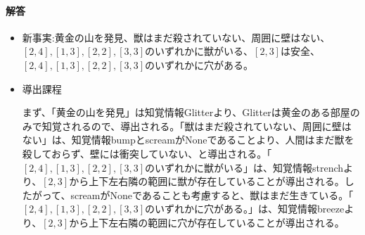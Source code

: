 \documentclass[dvipdfmx]{jsarticle}
\begin{document}
\begin{enumerate}
\paragraph{解答}
\begin{itemize}
  \item 新事実:黄金の山を発見、獣はまだ殺されていない、周囲に壁はない、$[2,4],[1,3],[2,2],[3,3]$のいずれかに獣がいる、$[2,3]$は安全、$[2,4],[1,3],[2,2],[3,3]$のいずれかに穴がある。
  \item 導出課程\par
  まず、「黄金の山を発見」は知覚情報Glitterより、Glitterは黄金のある部屋のみで知覚されるので、導出される。「獣はまだ殺されていない、周囲に壁はない」は、知覚情報bumpとscreamがNoneであることより、人間はまだ獣を殺しておらず、壁には衝突していない、と導出される。「$[2,4],[1,3],[2,2],[3,3]$のいずれかに獣がいる」は、知覚情報strenchより、$[2,3]$から上下左右隣の範囲に獣が存在していることが導出される。したがって、screamがNoneであることも考慮すると、獣はまだ生きている。「$[2,4],[1,3],[2,2],[3,3]$のいずれかに穴がある。」は、知覚情報breezeより、$[2,3]$から上下左右隣の範囲に穴が存在していることが導出される。
\end{itemize}

\end{enumerate}
\end{document}
